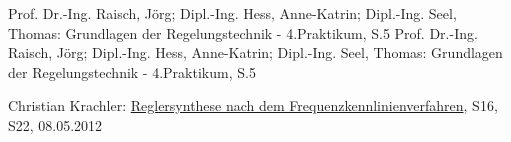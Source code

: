 \begin{thebibliography}{999}
 Prof. Dr.-Ing. Raisch, Jörg; Dipl.-Ing. Hess, Anne-Katrin; Dipl.-Ing. Seel, Thomas:
Grundlagen der Regelungstechnik - 4.Praktikum, S.5
 Prof. Dr.-Ing. Raisch, Jörg; Dipl.-Ing. Hess, Anne-Katrin; Dipl.-Ing. Seel, Thomas:
Grundlagen der Regelungstechnik - 4.Praktikum, S.5



Christian Krachler:
\href{http://www.krachler.com/fileadmin/user_upload/arbeiten/Reglersynthese_Christian_Krachler.pdf}{Reglersynthese nach dem Frequenzkennlinienverfahren}, S16, S22, 08.05.2012



\end{thebibliography}



